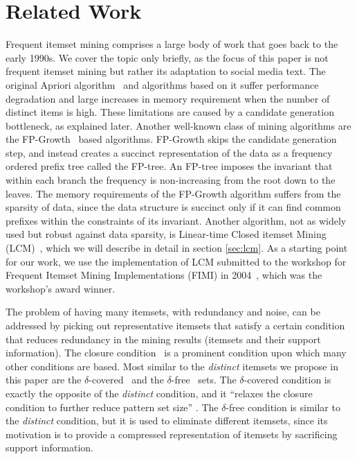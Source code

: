 \documentclass{sig-alternate}
\begin{document}
\section{Related Work}
\label{sec:related}
Frequent itemset mining comprises a large body of work that goes back to the
early 1990s.
We cover the topic only briefly, as the focus of this paper is not frequent
itemset mining but rather its adaptation to social media text.
The original Apriori algorithm~\cite{agrawal1994fast} and algorithms based on
it suffer performance degradation and  large increases in memory requirement
when the number of distinct items is high.
These limitations are caused by a candidate generation bottleneck,
as explained later.
Another well-known class of mining algorithms are the
FP-Growth~\cite{han2000mining} based algorithms.
FP-Growth skips the candidate generation step, and instead creates a succinct
representation of the data as a frequency ordered prefix tree called the
FP-tree.
An FP-tree imposes the invariant that within each branch the frequency is
non-increasing from the root down to the leaves. 
The memory requirements of the FP-Growth algorithm suffers from the sparsity
of data, since the data structure is succinct only if it can find common
prefixes within the constraints of its invariant. 
Another algorithm, not as widely used but robust against data sparsity, is
Linear-time Closed itemset Mining (LCM)~\cite{uno2004lcm},
which we will describe in detail in section \ref{sec:lcm}.
As a starting point for our work, we use the implementation of LCM submitted
to the workshop for Frequent Itemset Mining Implementations (FIMI) in
2004~\cite{DBLP:conf/fimi/2004}, which was the workshop's award winner. 

The problem of having many itemsets, with redundancy and noise, can be addressed by
picking out  representative itemsets that satisfy a certain condition
that reduces redundancy in the mining results (itemsets and their support information).
The closure condition~\cite{pasquier1999discovering} is a prominent condition
upon which many other conditions are based.
Most similar to the \emph{distinct} itemsets we propose in this paper
are the $\delta$-covered~\cite{xin2005mining} and the
$\delta$-free~\cite{boulicaut2003free} sets.
The $\delta$-covered condition is exactly the opposite of the \emph{distinct}
condition, and it ``relaxes the closure condition to further reduce pattern
set size'' \cite{liu2012finding}.
The $\delta$-free condition is similar to the \emph{distinct} condition,
but it is used to eliminate different itemsets, since its motivation
is to provide a compressed representation of itemsets by sacrificing support
information. 
\end{document}
